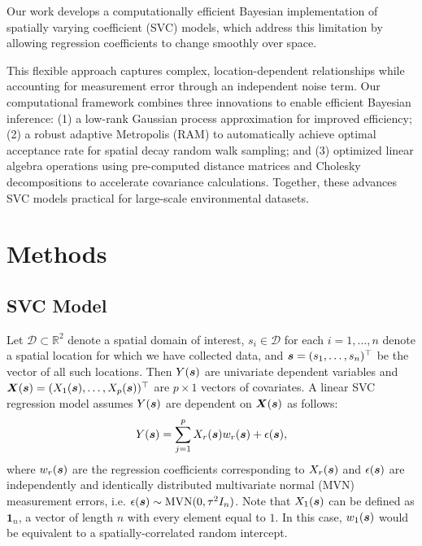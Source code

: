 Our work develops a computationally efficient Bayesian implementation of spatially varying coefficient (SVC) models, which address this limitation by allowing regression coefficients to change smoothly over space.

This flexible approach captures complex, location-dependent relationships while accounting for measurement error through an independent noise term. Our computational framework combines three innovations to enable efficient Bayesian inference: 
(1) a low-rank Gaussian process approximation for improved efficiency; 
(2) a robust adaptive Metropolis (RAM) to automatically achieve optimal acceptance rate for spatial decay random walk sampling; and
(3) optimized linear algebra operations using pre-computed distance matrices and Cholesky decompositions to accelerate covariance calculations. 
Together, these advances SVC models practical for large-scale environmental datasets.
\section{Methods}
\label{sec:methods}
\subsection{SVC Model}
\label{sec:model}
Let $\mathcal{D} \subset \mathbb{R}^2$ denote a spatial domain of interest, $s_i \in \mathcal{D}$ for each $i = 1, \dots, n$ denote a spatial location for which we have collected data, and $\boldsymbol{s} = (s_1, \dots, s_n)^\top$ be the vector of all such locations. Then $Y(\boldsymbol{s})$ are univariate dependent variables and $\boldsymbol{X}(\boldsymbol{s}) = (X_1(\boldsymbol{s}), \dots, X_p(\boldsymbol{s}))^\top$ are $p \times 1$ vectors of covariates. A linear SVC regression model assumes $Y(\boldsymbol{s})$ are dependent on $\boldsymbol{X}(\boldsymbol{s})$ as follows:
\begin{align*}
    Y(\boldsymbol{s}) = \sum_{j=1}^p X_r(\boldsymbol{s})w_r(\boldsymbol{s}) + \epsilon(\boldsymbol{s}),
\end{align*}
where $w_r(\boldsymbol{s})$ are the regression coefficients corresponding to $X_r(\boldsymbol{s})$ and $\epsilon(\boldsymbol{s})$ are independently and identically distributed multivariate normal (MVN) measurement errors, i.e. $\epsilon(\boldsymbol{s}) \sim \text{MVN}(0, \tau^2 I_n)$. Note that $X_1(\boldsymbol{s})$ can be defined as $\mathbf{1}_n$, a vector of length $n$ with every element equal to $1$. In this case, $w_1(\boldsymbol{s})$ would be equivalent to a spatially-correlated random intercept.

